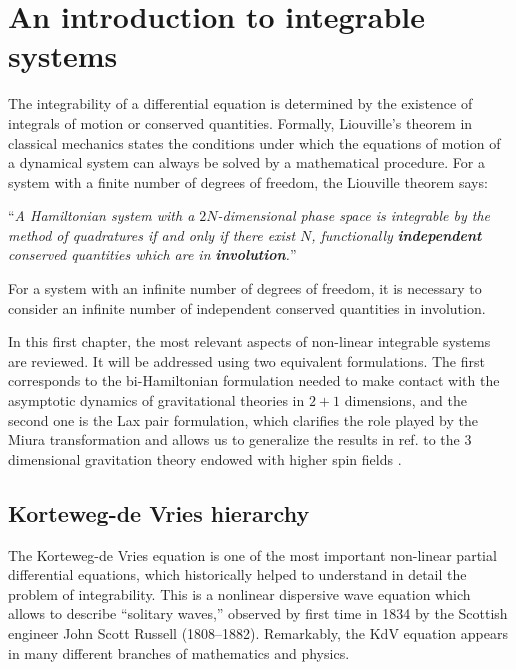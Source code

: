 \documentclass[letterpaper,11pt,oneside]{book}
\begin{document}
\newpage{}


\chapter{An introduction to integrable systems\label{chapter:Integrable systems}}

The integrability of a differential equation is determined by the
existence of integrals of motion or conserved quantities. Formally,
Liouville's theorem in classical mechanics states the conditions under
which the equations of motion of a dynamical system can always be
solved by a mathematical procedure. For a system with a finite number
of degrees of freedom, the Liouville theorem says:

``\textit{A Hamiltonian system with a $2N$-dimensional phase space
	is integrable by the method of quadratures if and only if there exist
}\textbf{\textit{$N$}}\textit{, functionally }\textbf{\textit{independent}}\textit{
	conserved quantities which are in }\textbf{\textit{involution}}\textit{.}''

For a system with an infinite number of degrees of freedom, it is necessary to consider an infinite number of independent conserved quantities
in involution.

In this first chapter, the most relevant aspects of non-linear integrable systems are reviewed. It will be addressed using two equivalent formulations. The first corresponds to the bi-Hamiltonian formulation needed to make contact with the asymptotic dynamics of gravitational theories in $2+1$ dimensions, and the second one is the Lax pair formulation, which clarifies the role played by the Miura transformation and allows us to generalize the results in ref. \cite{Perez:2016vqo, Ojeda:2019xih} to the $3$ dimensional gravitation theory endowed with higher spin fields \cite{Ojeda:2020bgz}.


\section{Korteweg-de Vries hierarchy\label{sec:KdV hierarchy}}

The Korteweg-de Vries equation is one of the most important non-linear
partial differential equations, which historically helped to understand
in detail the problem of integrability. This is a nonlinear dispersive
wave equation which allows to describe \textquotedblleft solitary
waves,\textquotedblright{} observed by first time in 1834 by the Scottish engineer John Scott Russell (1808--1882). Remarkably, the KdV equation appears in many different branches of mathematics and physics.
\end{document}
